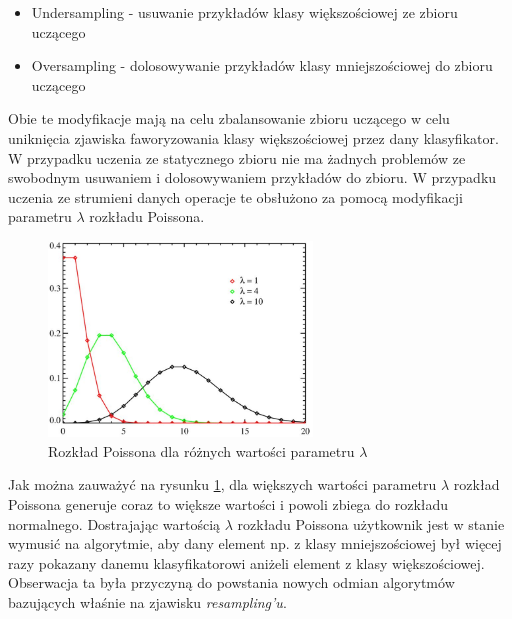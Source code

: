 \begin{itemize}
    \item Undersampling - usuwanie przykładów klasy większościowej ze zbioru uczącego
    \item Oversampling - dolosowywanie przykładów klasy mniejszościowej do zbioru uczącego
\end{itemize}

\noindent Obie te modyfikacje mają na celu zbalansowanie zbioru uczącego w celu uniknięcia zjawiska faworyzowania klasy większościowej przez dany klasyfikator. W przypadku uczenia ze statycznego zbioru nie ma żadnych problemów ze swobodnym usuwaniem i dolosowywaniem przykładów do zbioru. W przypadku uczenia ze strumieni danych operacje te obsłużono za pomocą modyfikacji parametru $\lambda$ rozkładu Poissona.

\begin{figure}[h] 
    \centering
    \includegraphics[width=7cm]{figures/poisson.JPG}
    \caption{Rozkład Poissona dla różnych wartości parametru $\lambda$}\label{Figure:Poisson}
\end{figure}

\noindent Jak można zauważyć na rysunku \ref{Figure:Poisson}, dla większych wartości parametru $\lambda$ rozkład Poissona generuje coraz to większe wartości i powoli zbiega do rozkładu normalnego. Dostrajając wartością $\lambda$ rozkładu Poissona użytkownik jest w stanie wymusić na algorytmie, aby dany element np. z klasy mniejszościowej był więcej razy pokazany danemu klasyfikatorowi aniżeli element z klasy większościowej. Obserwacja ta była przyczyną do powstania nowych odmian algorytmów bazujących właśnie na zjawisku \textit{resampling'u}.

